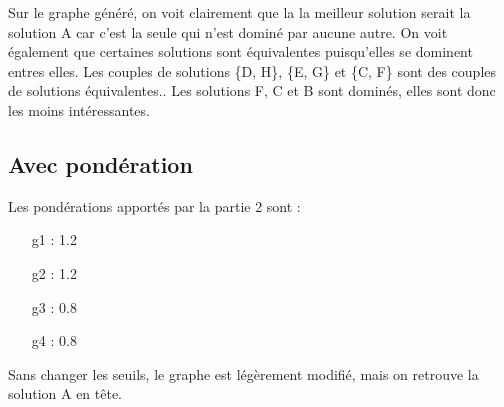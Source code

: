 Sur le graphe généré, on voit clairement que la la meilleur solution serait la
solution A car c'est la seule qui n'est dominé par aucune autre.
On voit également que certaines solutions sont équivalentes puisqu'elles se
dominent entres elles. Les couples de solutions \{D, H\}, \{E, G\} et \{C, F\}
sont des couples de solutions équivalentes..
Les solutions F, C et B sont dominés, elles sont donc les moins intéressantes.

\subsection{Avec pondération}

Les pondérations apportés par la partie 2 sont :
\begin{itemize}
\item[g1] : 1.2
\item[g2] : 1.2
\item[g3] : 0.8
\item[g4] : 0.8
\end{itemize}

Sans changer les seuils, le graphe est légèrement modifié, mais on retrouve la solution A en tête.
